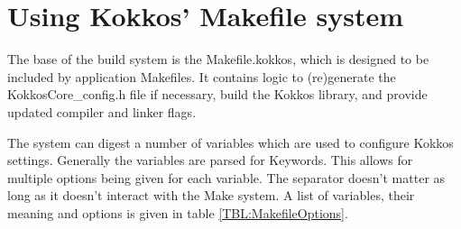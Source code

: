 \section{Using Kokkos' Makefile system}\label{S:build:make}

The base of the build system is the Makefile.kokkos, which is designed to be included by application Makefiles.
It contains logic to (re)generate the KokkosCore\_config.h file if necessary, build the Kokkos library, and provide updated compiler and linker flags.
    
The system can digest a number of variables which are used to configure Kokkos settings. 
Generally the variables are parsed for Keywords. 
This allows for multiple options being given for each variable. 
The separator doesn't matter as long as it doesn't interact with the Make system.
A list of variables, their meaning and options is given in table \ref{TBL:MakefileOptions}. 
    

